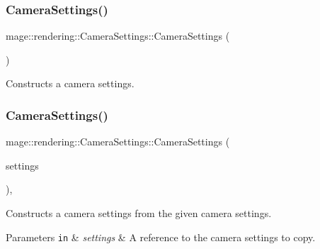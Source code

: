\subsubsection{\texorpdfstring{Camera\+Settings()}{CameraSettings()}\hspace{0.1cm}{\footnotesize\ttfamily [1/3]}}
{\footnotesize\ttfamily mage\+::rendering\+::\+Camera\+Settings\+::\+Camera\+Settings (\begin{DoxyParamCaption}{ }\end{DoxyParamCaption})\hspace{0.3cm}{\ttfamily [noexcept]}}

Constructs a camera settings. \hypertarget{classmage_1_1rendering_1_1_camera_settings_af0501d9365b74ce296a517b40a13e81e}{}\label{classmage_1_1rendering_1_1_camera_settings_af0501d9365b74ce296a517b40a13e81e} 
\subsubsection{\texorpdfstring{Camera\+Settings()}{CameraSettings()}\hspace{0.1cm}{\footnotesize\ttfamily [2/3]}}
{\footnotesize\ttfamily mage\+::rendering\+::\+Camera\+Settings\+::\+Camera\+Settings (\begin{DoxyParamCaption}\item[{const \hyperlink{classmage_1_1rendering_1_1_camera_settings}{Camera\+Settings} \&}]{settings }\end{DoxyParamCaption})\hspace{0.3cm}{\ttfamily [default]}, {\ttfamily [noexcept]}}

Constructs a camera settings from the given camera settings.


\begin{DoxyParams}[1]{Parameters}
\mbox{\tt in}  & {\em settings} & A reference to the camera settings to copy. \\
\hline
\end{DoxyParams}
\hypertarget{classmage_1_1rendering_1_1_camera_settings_a08e6d9c319feb6af0c14f4d057220da8}{}\label{classmage_1_1rendering_1_1_camera_settings_a08e6d9c319feb6af0c14f4d057220da8} 
